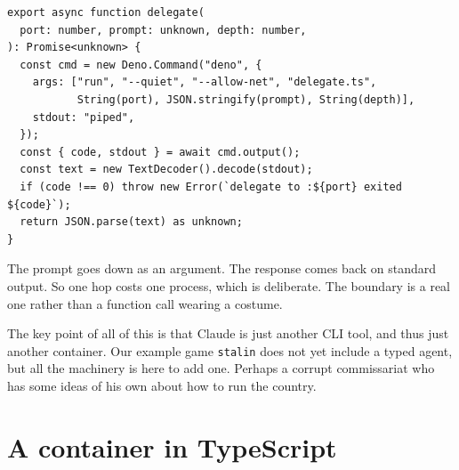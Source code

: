 \documentclass[11pt,a4paper]{article}
\begin{document}
\begin{lstlisting}[language=TS]
export async function delegate(
  port: number, prompt: unknown, depth: number,
): Promise<unknown> {
  const cmd = new Deno.Command("deno", {
    args: ["run", "--quiet", "--allow-net", "delegate.ts",
           String(port), JSON.stringify(prompt), String(depth)],
    stdout: "piped",
  });
  const { code, stdout } = await cmd.output();
  const text = new TextDecoder().decode(stdout);
  if (code !== 0) throw new Error(`delegate to :${port} exited ${code}`);
  return JSON.parse(text) as unknown;
}
\end{lstlisting}

The prompt goes down as an argument. The response comes back on standard output. So one hop costs one
process, which is deliberate. The boundary is a real one rather than a function call wearing a
costume.

\begin{sectionbox}
The key point of all of this is that Claude is just another CLI tool, and thus just another
container. Our example game \texttt{stalin} does not yet include a typed agent, but all the
machinery is here to add one. Perhaps a corrupt
commissariat who has some ideas of his own about how to run the country.
\end{sectionbox}

\newpage

\section{A container in TypeScript}
\label{sec:contts}
\end{document}
